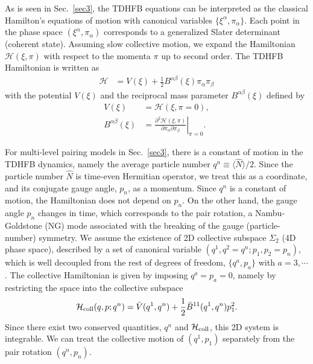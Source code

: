 \documentclass[11pt]{book} %
\begin{document}
As is seen in Sec.~\ref{sec3}, the TDHFB equations can be
interpreted as the classical Hamilton's equations of motion
with canonical variables $\{\xi^{\alpha},\pi_{\alpha}\}$. 
Each point in the phase space $(\xi^{\alpha},\pi_{\alpha})$
corresponds to a generalized Slater determinant (coherent state).
Assuming slow collective motion,
we expand the Hamiltonian $\mathcal{H}(\xi,\pi)$ with respect to
the momenta $\pi$ up to second order.
The TDHFB Hamiltonian is written as
\begin{align}
 \mathcal{H} &= V(\xi) + \frac{1}{2}B^{\alpha\beta}(\xi)\pi_{\alpha}\pi_{\beta}
\end{align}
with the potential $V(\xi)$ and
the reciprocal mass parameter $B^{\alpha\beta}(\xi)$ defined by
\begin{align}
  V(\xi) &= \mathcal{H}(\xi,\pi=0) , \\
  B^{\alpha\beta}(\xi) &= \left. \frac{\partial^2\mathcal{H}(\xi,\pi)}{\partial\pi_{\alpha}\partial\pi_{\beta}} \right|_{\pi=0}.
\end{align}

For multi-level pairing models in Sec.~\ref{sec3}, 
there is a constant of motion in the TDHFB dynamics,
namely the average particle number $q^n\equiv \langle \hat{N} \rangle/2$.
Since the particle number $\hat{N}$ is time-even Hermitian operator, we treat
this as a coordinate, and its conjugate gauge angle, $p_n$,
as a momentum.
Since $q^n$ is a constant of motion, the Hamiltonian does not
depend on $p_n$.
On the other hand, the gauge angle $p_n$ changes in time,
which corresponds to the pair rotation, a Nambu-Goldstone (NG) mode
associated with the breaking of the gauge (particle-number) symmetry.
We assume the existence of 2D collective subspace $\Sigma_2$
(4D phase space),
described by a set of canonical variable $(q^1,q^2=q^n;p_1,p_2=p_n)$,
which is well decoupled from the rest of degrees of freedom,
$\{q^a,p_a\}$ with $a=3,\cdots$.
The collective Hamiltonian is given by imposing $q^a=p_a=0$,
namely by restricting the space into the collective subspace
\begin{equation}
\mathcal{H}_{\rm coll}(q,p;q^n)
= \bar{V}(q^1,q^n) + \frac{1}{2}\bar{B}^{11}(q^1,q^n)p_1^2 .
  \label{coll}
\end{equation}
Since there exist two conserved quantities, $q^n$ and $\mathcal{H}_{\rm coll}$,
this 2D system is integrable.
We can treat the collective motion of $(q^1,p_1)$ separately from
the pair rotation $(q^n, p_n)$.
\end{document}
